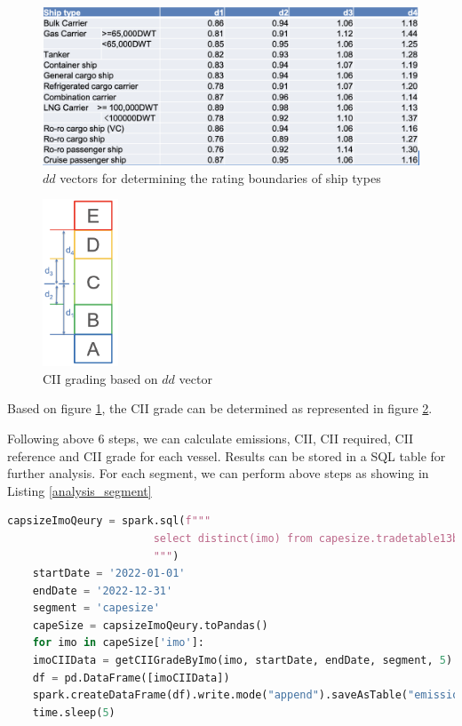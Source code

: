 \begin{figure}[h]
    \centering
    \includegraphics[width=1\textwidth]{images/dd_vecotor.png}
    \caption{$dd$ vectors for determining the rating boundaries of ship types}
    \label{dd_vecotor}
\end{figure}

\begin{figure}[h]
    \centering
    \includegraphics[width=0.2\textwidth]{images/cii_grade_dd_grade.png}
    \caption{CII grading based on $dd$ vector}
    \label{cii_grade_dd_grade}
\end{figure}

Based on figure \ref{dd_vecotor}, the CII grade can be determined as represented in figure \ref{cii_grade_dd_grade}.


Following above 6 steps, we can calculate emissions, CII, CII required, CII reference and CII grade for each vessel.
Results can be stored in a SQL table for further analysis.
For each segment, we can perform above steps as showing in Listing \ref{analysis_segment}

\begin{lstlisting}[language=python, caption=Analysis for capsize segment, label=analysis_segment]
    capsizeImoQeury = spark.sql(f"""
                       select distinct(imo) from capesize.tradetable13bx as st
                       """)
    startDate = '2022-01-01'
    endDate = '2022-12-31'
    segment = 'capesize'
    capeSize = capsizeImoQeury.toPandas()
    for imo in capeSize['imo']:
    imoCIIData = getCIIGradeByImo(imo, startDate, endDate, segment, 5)
    df = pd.DataFrame([imoCIIData])
    spark.createDataFrame(df).write.mode("append").saveAsTable("emissions.capesize_cii_2022_v3")
    time.sleep(5)
\end{lstlisting}

